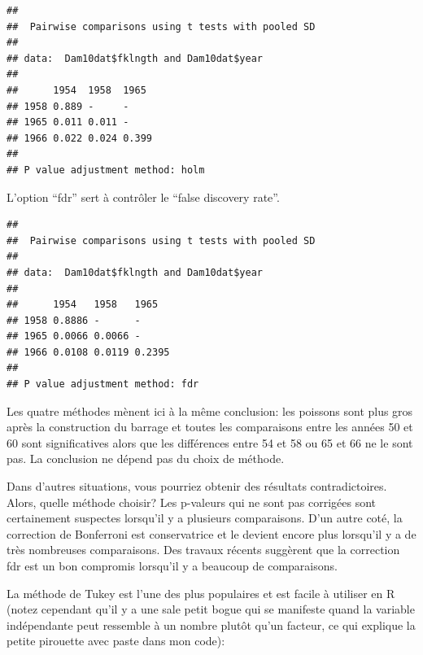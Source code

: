 \documentclass[12pt,]{book}
\newenvironment{Shaded}{\begin{snugshade}}{\end{snugshade}}
\newcommand{\DataTypeTok}[1]{\textcolor[rgb]{0.27,0.27,0.27}{#1}}
\newcommand{\KeywordTok}[1]{\textcolor[rgb]{0.27,0.27,0.27}{\textbf{#1}}}
\newcommand{\NormalTok}[1]{#1}
\newcommand{\OperatorTok}[1]{\textcolor[rgb]{0.43,0.43,0.43}{\textbf{#1}}}
\newcommand{\StringTok}[1]{\textcolor[rgb]{0.5,0.5,0.5}{#1}}
\begin{document}
\begin{verbatim}
## 
## 	Pairwise comparisons using t tests with pooled SD 
## 
## data:  Dam10dat$fklngth and Dam10dat$year 
## 
##      1954  1958  1965 
## 1958 0.889 -     -    
## 1965 0.011 0.011 -    
## 1966 0.022 0.024 0.399
## 
## P value adjustment method: holm
\end{verbatim}

L'option ``fdr'' sert à contrôler le ``false discovery rate''.

\begin{Shaded}
\end{Shaded}

\begin{verbatim}
## 
## 	Pairwise comparisons using t tests with pooled SD 
## 
## data:  Dam10dat$fklngth and Dam10dat$year 
## 
##      1954   1958   1965  
## 1958 0.8886 -      -     
## 1965 0.0066 0.0066 -     
## 1966 0.0108 0.0119 0.2395
## 
## P value adjustment method: fdr
\end{verbatim}

Les quatre méthodes mènent ici à la même conclusion: les poissons sont plus gros après la construction du barrage et toutes les comparaisons entre les années 50 et 60 sont significatives alors que les différences entre 54 et 58 ou 65 et 66 ne le sont pas. La conclusion ne dépend pas du choix de méthode.

Dans d'autres situations, vous pourriez obtenir des résultats contradictoires. Alors, quelle méthode choisir? Les p-valeurs qui ne sont pas corrigées sont certainement suspectes lorsqu'il y a plusieurs comparaisons. D'un autre coté, la correction de Bonferroni est conservatrice et le devient encore plus lorsqu'il y a de très nombreuses comparaisons. Des travaux récents suggèrent que la correction fdr est un bon compromis lorsqu'il y a beaucoup de comparaisons.

La méthode de Tukey est l'une des plus populaires et est facile à utiliser en R (notez cependant qu'il y a une sale petit bogue qui se manifeste quand la variable indépendante peut ressemble à un nombre plutôt qu'un facteur, ce qui explique la petite pirouette avec paste dans mon code):

\begin{Shaded}
\end{Shaded}
\end{document}
